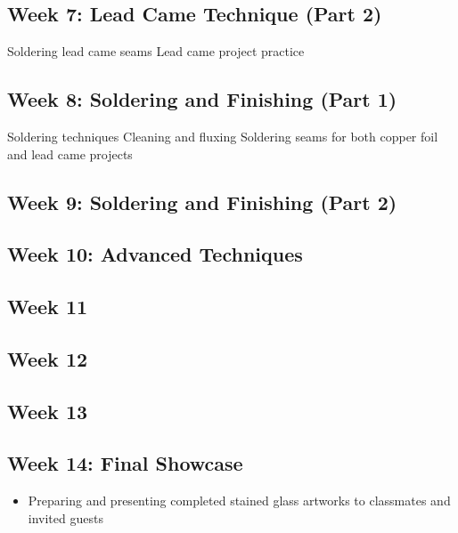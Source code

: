 \documentclass[11pt]{article}
\begin{document}
    \subsection*{Week 7: Lead Came Technique (Part 2)}
    Soldering lead came seams
    Lead came project practice
    \begin{itemize}

    \end{itemize}

    \subsection*{Week 8: Soldering and Finishing (Part 1)}
    Soldering techniques
    Cleaning and fluxing
    Soldering seams for both copper foil and lead came projects
    \begin{itemize}

    \end{itemize}

    \subsection*{Week 9: Soldering and Finishing (Part 2)}
    \begin{itemize}

    \end{itemize}

    \subsection*{Week 10: Advanced Techniques}
    \begin{itemize}

    \end{itemize}

    \subsection*{Week 11}
    \begin{itemize}

    \end{itemize}

    \subsection*{Week 12}
    \begin{itemize}

    \end{itemize}

    \subsection*{Week 13}
    \begin{itemize}

    \end{itemize}

    \subsection*{Week 14: Final Showcase}
    \begin{itemize}
        \item Preparing and presenting completed stained glass artworks to classmates and invited guests
    \end{itemize}
\end{document}

